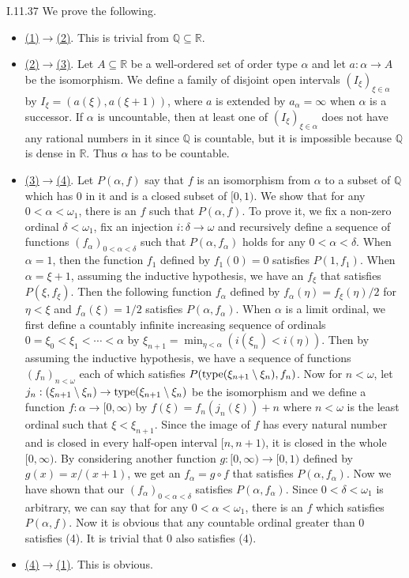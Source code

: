 \documentclass[12pt]{article}
\begin{document}
\begin{customthm}{I.11.37}
  We prove the following.
  \begin{itemize}
    \item\underline{(1)$\rightarrow$(2)}. This is trivial from $\mathbb{Q}\subseteq\mathbb{R}$.
    \item\underline{(2)$\rightarrow$(3)}. Let $A\subseteq\mathbb{R}$ be a well-ordered set of order type $\alpha$ and let $a:\alpha\rightarrow A$ be the isomorphism. We define a family of disjoint open intervals $(I_\xi)_{\xi\in\alpha}$ by $I_\xi=(a(\xi),a(\xi+1))$, where $a$ is extended by $a_\alpha=\infty$ when $\alpha$ is a successor. If $\alpha$ is uncountable, then at least one of $(I_\xi)_{\xi\in\alpha}$ does not have any rational numbers in it since $\mathbb{Q}$ is countable, but it is impossible because $\mathbb{Q}$ is dense in $\mathbb{R}$. Thus $\alpha$ has to be countable.
    \item\underline{(3)$\rightarrow$(4)}. Let $P(\alpha,f)$ say that $f$ is an isomorphism from $\alpha$ to a subset of $\mathbb{Q}$ which has $0$ in it and is a closed subset of $[0,1)$. We show that for any $0<\alpha<\omega_1$, there is an $f$ such that $P(\alpha,f)$. To prove it, we fix a non-zero ordinal $\delta<\omega_1$, fix an injection $i:\delta\rightarrow\omega$ and recursively define a sequence of functions $(f_\alpha)_{0<\alpha<\delta}$ such that $P(\alpha,f_\alpha)$ holds for any $0<\alpha<\delta$. When $\alpha=1$, then the function $f_1$ defined by $f_1(0)=0$ satisfies $P(1,f_1)$. When $\alpha=\xi+1$, assuming the inductive hypothesis, we have an $f_\xi$ that satisfies $P(\xi,f_\xi)$. Then the following function $f_\alpha$ defined by $f_\alpha(\eta)=f_\xi(\eta)/2$ for $\eta<\xi$ and $f_\alpha(\xi)=1/2$ satisfies $P(\alpha,f_\alpha)$. When $\alpha$ is a limit ordinal, we first define a countably infinite increasing sequence of ordinals $0=\xi_0<\xi_1<\cdots<\alpha$ by $\xi_{n+1}=\min_{\eta<\alpha}(i(\xi_n)<i(\eta))$. Then by assuming the inductive hypothesis, we have a sequence of functions $(f_n)_{n<\omega}$ each of which satisfies $P(\mathop{\mathrm{type}}(\xi_{n+1}\setminus\xi_n),f_n)$. Now for $n<\omega$, let $j_n:(\xi_{n+1}\setminus\xi_n)\rightarrow\mathop{\mathrm{type}}(\xi_{n+1}\setminus\xi_n)$ be the isomorphism and we define a function $f:\alpha\rightarrow[0,\infty)$ by $f(\xi)=f_n(j_n(\xi))+n$ where $n<\omega$ is the least ordinal such that $\xi<\xi_{n+1}$. Since the image of $f$ has every natural number and is closed in every half-open interval $[n,n+1)$, it is closed in the whole $[0,\infty)$. By considering another function $g:[0,\infty)\rightarrow[0,1)$ defined by $g(x)=x/(x+1)$, we get an $f_\alpha=g\circ f$ that satisfies $P(\alpha,f_\alpha)$. Now we have shown that our $(f_\alpha)_{0<\alpha<\delta}$ satisfies $P(\alpha,f_\alpha)$. Since $0<\delta<\omega_1$ is arbitrary, we can say that for any $0<\alpha<\omega_1$, there is an $f$ which satisfies $P(\alpha,f)$. Now it is obvious that any countable ordinal greater than $0$ satisfies (4). It is trivial that $0$ also satisfies (4).
    \item\underline{(4)$\rightarrow$(1)}. This is obvious.
  \end{itemize}
\end{customthm}
\end{document}
